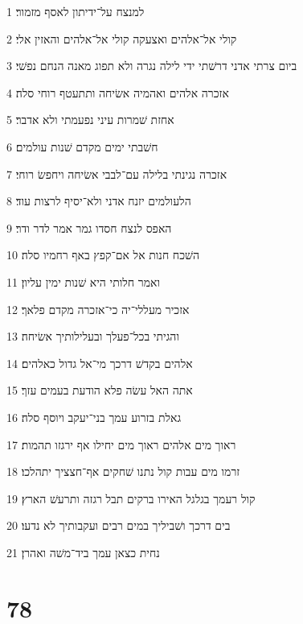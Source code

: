 \par 1 למנצח על־ידיתון לאסף מזמור׃
\par 2 קולי אל־אלהים ואצעקה קולי אל־אלהים והאזין אלי׃
\par 3 ביום צרתי אדני דרשׁתי ידי לילה נגרה ולא תפוג מאנה הנחם נפשׁי׃
\par 4 אזכרה אלהים ואהמיה אשׂיחה ותתעטף רוחי סלה׃
\par 5 אחזת שׁמרות עיני נפעמתי ולא אדבר׃
\par 6 חשׁבתי ימים מקדם שׁנות עולמים׃
\par 7 אזכרה נגינתי בלילה עם־לבבי אשׂיחה ויחפשׂ רוחי׃
\par 8 הלעולמים יזנח אדני ולא־יסיף לרצות עוד׃
\par 9 האפס לנצח חסדו גמר אמר לדר ודר׃
\par 10 השׁכח חנות אל אם־קפץ באף רחמיו סלה׃
\par 11 ואמר חלותי היא שׁנות ימין עליון׃
\par 12 אזכיר מעללי־יה כי־אזכרה מקדם פלאך׃
\par 13 והגיתי בכל־פעלך ובעלילותיך אשׂיחה׃
\par 14 אלהים בקדשׁ דרכך מי־אל גדול כאלהים׃
\par 15 אתה האל עשׂה פלא הודעת בעמים עזך׃
\par 16 גאלת בזרוע עמך בני־יעקב ויוסף סלה׃
\par 17 ראוך מים אלהים ראוך מים יחילו אף ירגזו תהמות׃
\par 18 זרמו מים עבות קול נתנו שׁחקים אף־חצציך יתהלכו׃
\par 19 קול רעמך בגלגל האירו ברקים תבל רגזה ותרעשׁ הארץ׃
\par 20 בים דרכך ושׁביליך במים רבים ועקבותיך לא נדעו׃
\par 21 נחית כצאן עמך ביד־משׁה ואהרן׃

\chapter{78}

